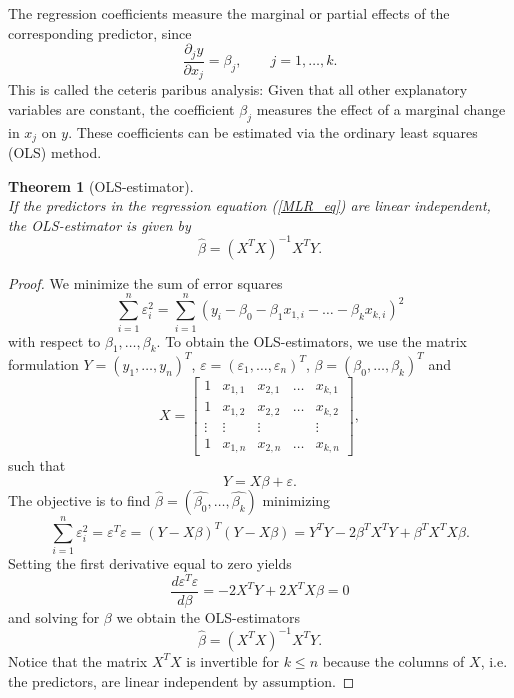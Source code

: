 \documentclass[a4paper, 11pt]{scrreprt}
\newtheorem{Theorem}{Theorem}[chapter]
\begin{document}
The regression coefficients measure the marginal or partial effects of the corresponding predictor, since
\begin{equation}
\frac{\partial_j y}{\partial x_j} = \beta_j, \qquad j=1,\ldots,k. 
\end{equation}
This is called the ceteris paribus analysis: Given that all other explanatory variables are constant, the coefficient $\beta_j$ measures the effect of a marginal change in $x_j$ on $y$.
These coefficients can be estimated via the ordinary least squares (OLS) method. 

\begin{Theorem}[OLS-estimator] \upshape $\text{ }$ \\
If the predictors in the regression equation (\ref{MLR_eq}) are linear independent, the OLS-estimator is given by 
\begin{equation}\label{OLS}
\hat{\beta} = (X^T X)^{-1} X^T Y.
\end{equation}
\end{Theorem}

\begin{proof}
We minimize the sum of error squares 
\begin{equation}
\sum_{i=1}^n \varepsilon_i^2 = \sum_{i=1}^n (y_i - \beta_0 - \beta_1 x_{1,i} - \ldots - \beta_k x_{k,i})^2
\end{equation}
with respect to $\beta_1, \ldots, \beta_k$.
To obtain the OLS-estimators, we use the matrix formulation $Y = (y_1, \ldots, y_n)^T$, $\varepsilon = (\varepsilon_1, \ldots, \varepsilon_n)^T$, $\beta = (\beta_0, \ldots, \beta_k)^T$ and
\begin{equation} \label{matrix:X}
X= 
\begin{bmatrix}
1 & x_{1,1} & x_{2,1} & \dots & x_{k,1} \\
1 & x_{1,2} & x_{2,2} & \dots & x_{k,2} \\
\vdots & \vdots & \vdots & & \vdots \\
1 & x_{1,n} & x_{2,n} & \dots & x_{k,n} \end{bmatrix}, 
\end{equation} 
such that
\begin{equation}\label{OLS:eq}
 Y = X\beta + \varepsilon.
\end{equation}
The objective is to find $\hat{\beta} = (\hat{\beta_0}, \ldots, \hat{\beta_k})$ minimizing 
\[  \sum_{i=1}^n \varepsilon_i^2 = \varepsilon^T \varepsilon  = ( Y- X\beta)^T (Y-X\beta)= Y^T Y - 2\beta^T X^T Y + \beta^T X^T X \beta. \]
Setting the first derivative equal to zero yields
\[ \frac{d \varepsilon^T \varepsilon}{d \beta} = -2X^T Y + 2 X^T X \beta = 0 \]
and solving for $\beta$ we obtain the OLS-estimators
\begin{equation*}
\hat{\beta} = (X^T X)^{-1} X^T Y.
\end{equation*}
Notice that the matrix $X^T X$ is invertible for $k \leq n$ because the columns of $X$, i.e. the predictors, are linear independent by assumption.
\end{proof}
\end{document}
